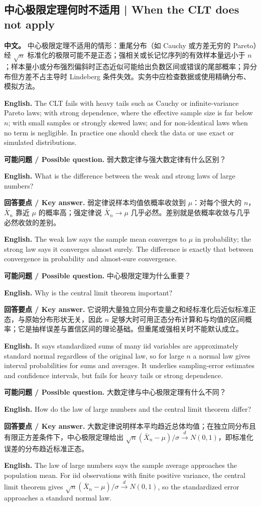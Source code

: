 \documentclass[UTF8,11pt,a4paper]{ctexart}
\newcommand{\EN}[1]{\par\noindent\textbf{English.} #1\par}
\newcommand{\ASK}[4]{\par\noindent\textbf{可能问题 / Possible question.} #1\par\EN{#2}\noindent\textbf{回答要点 / Key answer.} #3\par\EN{#4}\medskip}
\newcommand{\APS}[2]{\par\noindent\textbf{中文。} #1\par\noindent\textbf{English.} #2\par\smallskip}
\begin{document}
\subsection{中心极限定理何时不适用 | When the CLT does not apply}
\APS{中心极限定理不适用的情形：重尾分布（如 Cauchy 或方差无穷的 Pareto）经 $\sqrt n$ 标准化的极限可能不是正态；强相关或长记忆序列的有效样本量远小于 $n$；样本量小或分布强烈偏斜时正态近似可能给出负数区间或错误的尾部概率；异分布但方差不占主导时 Lindeberg 条件失效。实务中应检查数据或使用精确分布、模拟方法。}{The CLT fails with heavy tails such as Cauchy or infinite-variance Pareto laws; with strong dependence, where the effective sample size is far below $n$; with small samples or strongly skewed laws; and for non-identical laws when no term is negligible. In practice one should check the data or use exact or simulated distributions.}

\ASK{弱大数定律与强大数定律有什么区别？}{What is the difference between the weak and strong laws of large numbers?}{弱定律说样本均值依概率收敛到 $\mu$：对每个很大的 $n$，$\bar X_n$ 靠近 $\mu$ 的概率高；强定律说 $\bar X_n\to\mu$ 几乎必然。差别就是依概率收敛与几乎必然收敛的差别。}{The weak law says the sample mean converges to $\mu$ in probability; the strong law says it converges almost surely. The difference is exactly that between convergence in probability and almost-sure convergence.}

\ASK{中心极限定理为什么重要？}{Why is the central limit theorem important?}{它说明大量独立同分布变量之和经标准化后近似标准正态，与原始分布形状无关，因此 $n$ 足够大时可用正态分布计算和与均值的区间概率；它是抽样误差与置信区间的理论基础。但重尾或强相关时不能默认成立。}{It says standardized sums of many iid variables are approximately standard normal regardless of the original law, so for large $n$ a normal law gives interval probabilities for sums and averages. It underlies sampling-error estimates and confidence intervals, but fails for heavy tails or strong dependence.}

\ASK{大数定律与中心极限定理有什么不同？}{How do the law of large numbers and the central limit theorem differ?}{大数定律说明样本平均趋近总体均值；在独立同分布且有限正方差条件下，中心极限定理给出 $\sqrt n(\bar X_n-\mu)/\sigma\xrightarrow{d}N(0,1)$，即标准化误差的分布趋近标准正态。}{The law of large numbers says the sample average approaches the population mean. For iid observations with finite positive variance, the central limit theorem gives $\sqrt n(\bar X_n-\mu)/\sigma\xrightarrow{d}N(0,1)$, so the standardized error approaches a standard normal law.}
\end{document}

